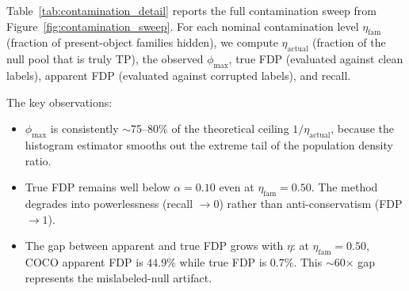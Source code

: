 \documentclass{article}
\theoremstyle{remark}
\newcommand{\1}{\mathbf{1}}
\begin{document}
Table~\ref{tab:contamination_detail} reports the full contamination sweep
from Figure~\ref{fig:contamination_sweep}. For each nominal contamination
level $\eta_{\mathrm{fam}}$ (fraction of present-object families hidden),
we compute $\eta_{\mathrm{actual}}$ (fraction of the null pool that is truly
TP), the observed $\phi_{\max}$, true FDP (evaluated against clean labels),
apparent FDP (evaluated against corrupted labels), and recall.

The key observations:
\begin{itemize}
\item $\phi_{\max}$ is consistently $\sim$75--80\% of the theoretical ceiling
$1/\eta_{\mathrm{actual}}$, because the histogram estimator smooths out the
extreme tail of the population density ratio.
\item True FDP remains well below $\alpha=0.10$ even at $\eta_{\mathrm{fam}}=0.50$.
The method degrades into powerlessness (recall $\to 0$) rather than
anti-conservatism (FDP $\to 1$).
\item The gap between apparent and true FDP grows with $\eta$: at
$\eta_{\mathrm{fam}}=0.50$, COCO apparent FDP is $44.9\%$ while true FDP is
$0.7\%$. This $\sim$60$\times$ gap represents the mislabeled-null artifact.
\end{itemize}
\end{document}
